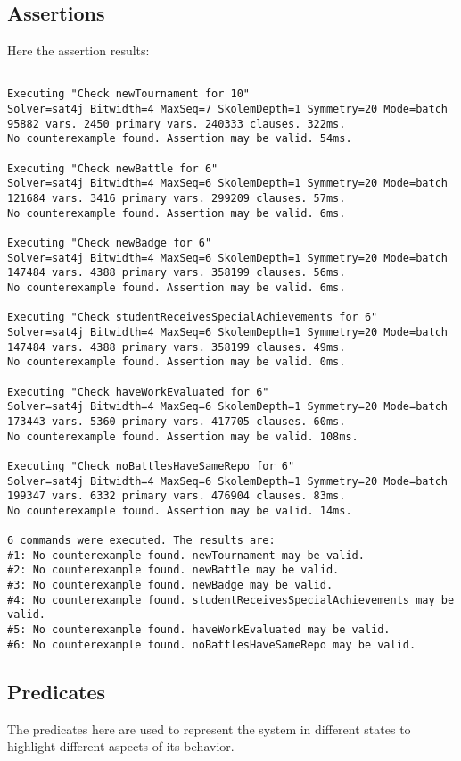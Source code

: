 \subsection{Assertions}
Here the assertion results:
\begin{lstlisting}[basicstyle=\footnotesize]

Executing "Check newTournament for 10"
Solver=sat4j Bitwidth=4 MaxSeq=7 SkolemDepth=1 Symmetry=20 Mode=batch
95882 vars. 2450 primary vars. 240333 clauses. 322ms.
No counterexample found. Assertion may be valid. 54ms.

Executing "Check newBattle for 6"
Solver=sat4j Bitwidth=4 MaxSeq=6 SkolemDepth=1 Symmetry=20 Mode=batch
121684 vars. 3416 primary vars. 299209 clauses. 57ms.
No counterexample found. Assertion may be valid. 6ms.

Executing "Check newBadge for 6"
Solver=sat4j Bitwidth=4 MaxSeq=6 SkolemDepth=1 Symmetry=20 Mode=batch
147484 vars. 4388 primary vars. 358199 clauses. 56ms.
No counterexample found. Assertion may be valid. 6ms.

Executing "Check studentReceivesSpecialAchievements for 6"
Solver=sat4j Bitwidth=4 MaxSeq=6 SkolemDepth=1 Symmetry=20 Mode=batch
147484 vars. 4388 primary vars. 358199 clauses. 49ms.
No counterexample found. Assertion may be valid. 0ms.

Executing "Check haveWorkEvaluated for 6"
Solver=sat4j Bitwidth=4 MaxSeq=6 SkolemDepth=1 Symmetry=20 Mode=batch
173443 vars. 5360 primary vars. 417705 clauses. 60ms.
No counterexample found. Assertion may be valid. 108ms.

Executing "Check noBattlesHaveSameRepo for 6"
Solver=sat4j Bitwidth=4 MaxSeq=6 SkolemDepth=1 Symmetry=20 Mode=batch
199347 vars. 6332 primary vars. 476904 clauses. 83ms.
No counterexample found. Assertion may be valid. 14ms.

6 commands were executed. The results are:
#1: No counterexample found. newTournament may be valid.
#2: No counterexample found. newBattle may be valid.
#3: No counterexample found. newBadge may be valid.
#4: No counterexample found. studentReceivesSpecialAchievements may be valid.
#5: No counterexample found. haveWorkEvaluated may be valid.
#6: No counterexample found. noBattlesHaveSameRepo may be valid.
\end{lstlisting}
\clearpage
\subsection{Predicates}
The predicates here are used to represent the system in different states to highlight different aspects of its behavior.
